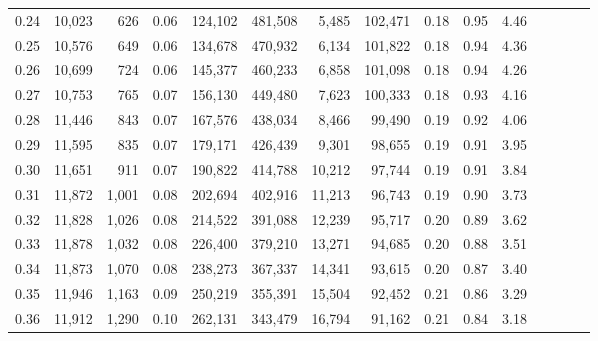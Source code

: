 \begin{tabular}{rrrcrrrrrrrrrrr}
0.24 &  10,023 &    626 &                                       0.06 &  124,102 &  481,508 &    5,485 &  102,471 &  0.18 &  0.95 &                         4.46 \\
0.25 &  10,576 &    649 &                                       0.06 &  134,678 &  470,932 &    6,134 &  101,822 &  0.18 &  0.94 &                         4.36 \\
0.26 &  10,699 &    724 &                                       0.06 &  145,377 &  460,233 &    6,858 &  101,098 &  0.18 &  0.94 &                         4.26 \\
0.27 &  10,753 &    765 &                                       0.07 &  156,130 &  449,480 &    7,623 &  100,333 &  0.18 &  0.93 &                         4.16 \\
0.28 &  11,446 &    843 &                                       0.07 &  167,576 &  438,034 &    8,466 &   99,490 &  0.19 &  0.92 &                         4.06 \\
0.29 &  11,595 &    835 &                                       0.07 &  179,171 &  426,439 &    9,301 &   98,655 &  0.19 &  0.91 &                         3.95 \\
0.30 &  11,651 &    911 &                                       0.07 &  190,822 &  414,788 &   10,212 &   97,744 &  0.19 &  0.91 &                         3.84 \\
0.31 &  11,872 &  1,001 &                                       0.08 &  202,694 &  402,916 &   11,213 &   96,743 &  0.19 &  0.90 &                         3.73 \\
0.32 &  11,828 &  1,026 &                                       0.08 &  214,522 &  391,088 &   12,239 &   95,717 &  0.20 &  0.89 &                         3.62 \\
0.33 &  11,878 &  1,032 &                                       0.08 &  226,400 &  379,210 &   13,271 &   94,685 &  0.20 &  0.88 &                         3.51 \\
0.34 &  11,873 &  1,070 &                                       0.08 &  238,273 &  367,337 &   14,341 &   93,615 &  0.20 &  0.87 &                         3.40 \\
0.35 &  11,946 &  1,163 &                                       0.09 &  250,219 &  355,391 &   15,504 &   92,452 &  0.21 &  0.86 &                         3.29 \\
0.36 &  11,912 &  1,290 &                                       0.10 &  262,131 &  343,479 &   16,794 &   91,162 &  0.21 &  0.84 &                         3.18 \\

\end{tabular}
